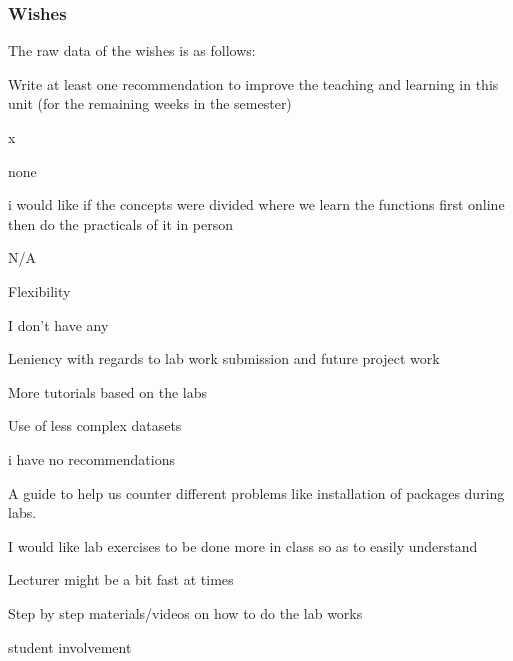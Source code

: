 \documentclass[
]{article}
\begin{document}
\newpage

\subsubsection{Wishes}\label{wishes}

The raw data of the wishes is as follows:

Write at least one recommendation to improve the teaching and learning
in this unit (for the remaining weeks in the semester)

x

none

i would like if the concepts were divided where we learn the functions
first online then do the practicals of it in person

N/A

Flexibility

I don't have any~

Leniency with regards to lab work submission and future project work

More tutorials based on the labs

Use of less complex datasets

i have no recommendations

A guide to help us counter different problems like installation of
packages during labs.

I would like lab exercises to be done more in class so as to easily
understand~

Lecturer might be a bit fast at times

Step by step materials/videos on how to do the lab works~

student involvement~~
\end{document}
